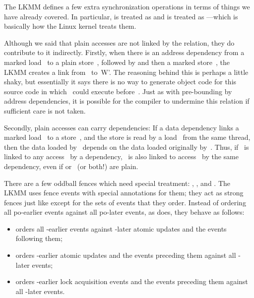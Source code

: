 The LKMM defines a few extra synchronization operations in terms of
things we have already covered.
In particular,  is
treated as  and  is treated as
---which is basically how the Linux kernel treats
them.

Although we said that plain accesses are not linked by the 
relation, they do contribute to it indirectly.
Firstly, when there is
an address dependency from a marked load~ to a plain store~,
followed by  and then a marked store~, the LKMM creates a
 link from~ to~{W'}.
The reasoning behind this is perhaps a little
shaky, but essentially it says there is no way to generate object code
for this source code in which ~could execute before~.
Just as with
pre-bounding by address dependencies, it is possible for the compiler
to undermine this relation if sufficient care is not taken.

Secondly, plain accesses can carry dependencies:
If a data dependency
links a marked load~ to a store~, and the store is read
by a load~
from the same thread, then the data loaded by~ depends on the data
loaded originally by~.
Thus, if ~is linked to any access~ by a
dependency, ~is also linked to access~ by the same dependency, even
if  or~ (or both{!}) are plain.

There are a few oddball fences which need special treatment:
, , and
.
The LKMM uses fence events with special
annotations for them; they act as strong fences just like 
except for the sets of events that they order.
Instead of ordering
all po-earlier events against all po-later events, as  does,
they behave as follows:

\begin{itemize}
\item	{} orders all -earlier events against
	-later atomic updates and the events following them;

\item	{} orders -earlier atomic updates and
	the events preceding them against all -later events;

\item	{} orders -earlier lock acquisition
	events and the events preceding them against all -later
	events.
\end{itemize}

